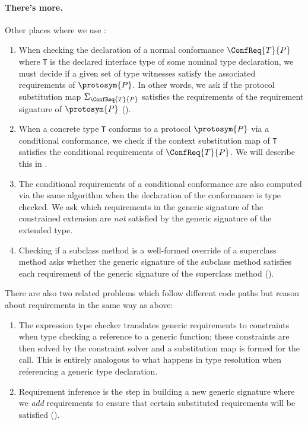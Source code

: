 \documentclass[../generics]{subfiles}
\begin{document}
\paragraph{There's more.} Other places where we use :
\begin{enumerate}
\item When checking the declaration of a normal conformance $\ConfReq{T}{P}$ where \texttt{T} is the declared interface type of some nominal type declaration, we must decide if a given set of type witnesses satisfy the associated requirements of $\protosym{P}$. In other words, we ask if the protocol substitution map $\Sigma_{\ConfReq{T}{P}}$ satisfies the requirements of the requirement signature of $\protosym{P}$ ().

\item When a concrete type \texttt{T} conforms to a protocol $\protosym{P}$ via a conditional conformance, we check if the context substitution map of \texttt{T} satisfies the conditional requirements of $\ConfReq{T}{P}$. We will describe this in .

\item The conditional requirements of a conditional conformance are also computed via the same algorithm when the declaration of the conformance is type checked. We ask which requirements in the generic signature of the constrained extension are \emph{not} satisfied by the generic signature of the extended type.

\item Checking if a subclass method is a well-formed override of a superclass method asks whether the generic signature of the subclass method satisfies each requirement of the generic signature of the superclass method ().
\end{enumerate}
There are also two related problems which follow different code paths but reason about requirements in the same way as above:
\begin{enumerate}
\item The expression type checker translates generic requirements to constraints when type checking a reference to a generic function; these constraints are then solved by the constraint solver and a substitution map is formed for the call. This is entirely analogous to what happens in type resolution when referencing a generic type declaration.

\item Requirement inference is the step in building a new generic signature where we \emph{add} requirements to ensure that certain substituted requirements will be satisfied ().
\end{enumerate}
\end{document}
